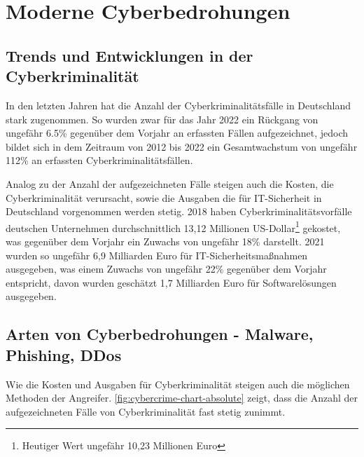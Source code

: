 \newpage


\section{Moderne Cyberbedrohungen}\label{sec:moderne-cyberbedrohungen}

\subsection{Trends und Entwicklungen in der Cyberkriminalität}\label{subsec:trends-und-entwicklungen-in-der-cyberkriminalitat}
In den letzten Jahren hat die Anzahl der Cyberkriminalitätsfälle in Deutschland stark zugenommen.
So wurden zwar für das Jahr 2022 ein Rückgang von ungefähr 6.5\% gegenüber dem Vorjahr an erfassten Fällen aufgezeichnet, jedoch bildet sich in dem Zeitraum von 2012 bis 2022 ein Gesamtwachstum von ungefähr 112\% an erfassten Cyberkriminalitätsfällen\autocite[\vglf][]{bka-cyberkriminalitaet}.

Analog zu der Anzahl der aufgezeichneten Fälle steigen auch die Kosten, die Cyberkriminalität verursacht, sowie die Ausgaben die für IT-Sicherheit in Deutschland vorgenommen werden stetig.
2018 haben Cyberkriminalitätsvorfälle deutschen Unternehmen durchschnittlich 13,12 Millionen US-Dollar\footnote{Heutiger Wert ungefähr 10,23 Millionen Euro} gekostet, was gegenüber dem Vorjahr ein Zuwachs von ungefähr 18\% darstellt\autocite[\vglf][]{accenture-cyberkrime-kosten}.
2021 wurden so ungefähr 6,9 Milliarden Euro für IT-Sicherheitsmaßnahmen ausgegeben, was einem Zuwachs von ungefähr 22\% gegenüber dem Vorjahr entspricht\autocite[\vglf][]{bitkom-itsicherheit}, davon wurden geschätzt 1,7 Milliarden Euro für Softwarelösungen ausgegeben\autocite[\vglf][]{bitkom-itsicherheit-segment}.

\subsection[Arten von Cyberbedrohungen]{Arten von Cyberbedrohungen - Malware, Phishing, DDos}\label{subsec:arten-von-cyberbedrohungen---malware-phishing-ddos}
Wie die Kosten und Ausgaben für Cyberkriminalität steigen auch die möglichen Methoden der Angreifer.
\autoref{fig:cybercrime-chart-absolute} zeigt, dass die Anzahl der aufgezeichneten Fälle von Cyberkriminalität fast stetig zunimmt.

